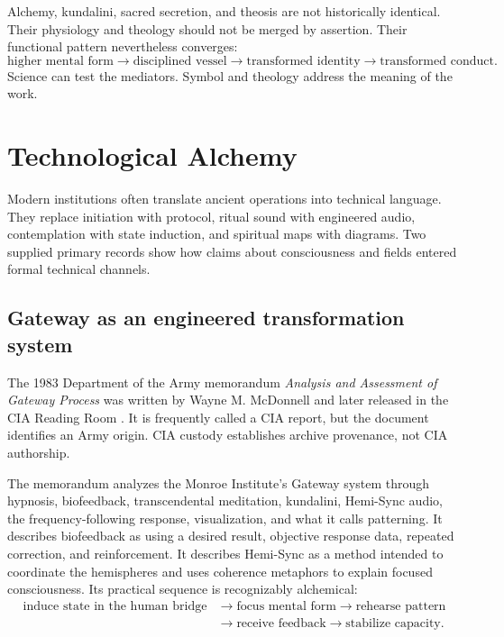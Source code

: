 \documentclass[11pt]{article}
\theoremstyle{plain}
\theoremstyle{definition}
\begin{document}
Alchemy, kundalini, sacred secretion, and theosis are not historically identical.
Their physiology and theology should not be merged by assertion. Their functional
pattern nevertheless converges:
\begin{equation}
\text{higher mental form}
\rightarrow
\text{disciplined vessel}
\rightarrow
\text{transformed identity}
\rightarrow
\text{transformed conduct}.
\label{eq:inner-alchemy}
\end{equation}
Science can test the mediators. Symbol and theology address the meaning of the work.

\section{Technological Alchemy}

Modern institutions often translate ancient operations into technical language. They
replace initiation with protocol, ritual sound with engineered audio, contemplation
with state induction, and spiritual maps with diagrams. Two supplied primary records
show how claims about consciousness and fields entered formal technical channels.

\subsection*{Gateway as an engineered transformation system}

The 1983 Department of the Army memorandum \emph{Analysis and Assessment of Gateway
Process} was written by Wayne M. McDonnell and later released in the CIA Reading Room
\citep{mcdonnell1983gateway}. It is frequently called a CIA report, but the document
identifies an Army origin. CIA custody establishes archive provenance, not CIA
authorship.

The memorandum analyzes the Monroe Institute's Gateway system through hypnosis,
biofeedback, transcendental meditation, kundalini, Hemi-Sync audio, the
frequency-following response, visualization, and what it calls patterning. It describes
biofeedback as using a desired result, objective response data, repeated correction,
and reinforcement. It describes Hemi-Sync as a method intended to coordinate the
hemispheres and uses coherence metaphors to explain focused consciousness. Its
practical sequence is recognizably alchemical:
\[
\begin{aligned}
\text{induce state in the human bridge}
&\rightarrow
\text{focus mental form}
\rightarrow
\text{rehearse pattern}\\
&\rightarrow
\text{receive feedback}
\rightarrow
\text{stabilize capacity}.
\end{aligned}
\]
\end{document}
